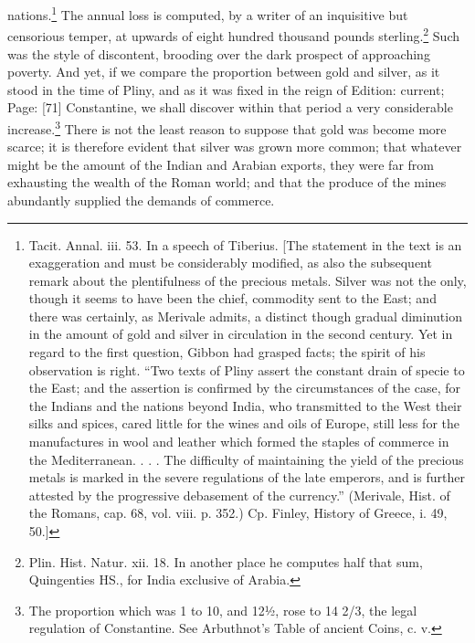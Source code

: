 nations.\footnote{Tacit. Annal. iii. 53. In a speech of Tiberius. [The statement in the text is an exaggeration and must be considerably modified, as also the subsequent remark about the plentifulness of the precious metals. Silver was not the only, though it seems to have been the chief, commodity sent to the East; and there was certainly, as Merivale admits, a distinct though gradual diminution in the amount of gold and silver in circulation in the second century. Yet in regard to the first question, Gibbon had grasped facts; the spirit of his observation is right. \texthebrew{“}Two texts of Pliny assert the constant drain of specie to the East; and the assertion is confirmed by the circumstances of the case, for the Indians and the nations beyond India, who transmitted to the West their silks and spices, cared little for the wines and oils of Europe, still less for the manufactures in wool and leather which formed the staples of commerce in the Mediterranean. . . . The difficulty of maintaining the yield of the precious metals is marked in the severe regulations of the late emperors, and is further attested by the progressive debasement of the currency.\texthebrew{}” (Merivale, Hist. of the Romans, cap. 68, vol. viii. p. 352.) Cp. Finley, History of Greece, i. 49, 50.]} The annual loss is computed, by a writer of an inquisitive but censorious temper, at upwards of eight hundred thousand pounds sterling.\footnote{Plin. Hist. Natur. xii. 18. In another place he computes half that sum, Quingenties HS., for India exclusive of Arabia.} Such was the style of discontent, brooding over the dark prospect of approaching poverty. And yet, if we compare the proportion between gold and silver, as it stood in the time of Pliny, and as it was fixed in the reign of Edition: current; Page: [71] Constantine, we shall discover within that period a very considerable increase.\footnote{The proportion which was 1 to 10, and 12½, rose to 14 2/3, the legal regulation of Constantine. See Arbuthnot\texthebrew{}’s Table of ancient Coins, c. v.} There is not the least reason to suppose that gold was become more scarce; it is therefore evident that silver was grown more common; that whatever might be the amount of the Indian and Arabian exports, they were far from exhausting the wealth of the Roman world; and that the produce of the mines abundantly supplied the demands of commerce.

